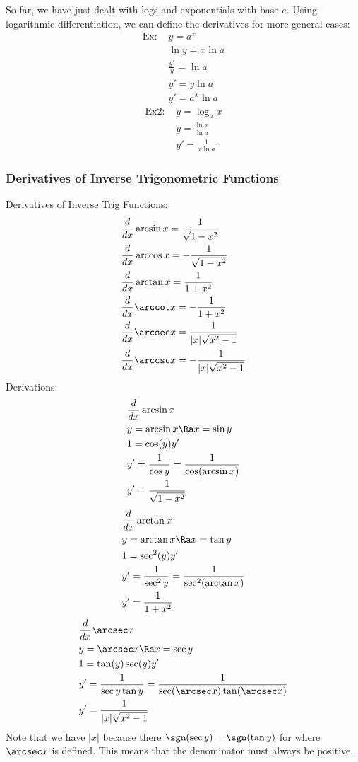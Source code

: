 So far, we have just dealt with logs and exponentials with base $e$. Using logarithmic differentiation, we can define the derivatives for more general cases:
\begin{align*}
    \text{Ex: }&y=a^x\\
    &\ln y=x\ln a\\
    &\frac{y'}{y}=\ln a\\
    &y'=y\ln a\\
    &y'=a^x\ln a
\end{align*}
\begin{align*}
    \text{Ex2: }&y=\log_ax\\
    &y=\frac{\ln x}{\ln a}\\
    &y'=\frac{1}{x\ln a}
\end{align*}

\subsubsection{Derivatives of Inverse Trigonometric Functions}
Derivatives of Inverse Trig Functions:
\begin{align*}
    &\frac{d}{dx}\arcsin x=\frac{1}{\sqrt{1-x^2}}\\
    &\frac{d}{dx}\arccos x=-\frac{1}{\sqrt{1-x^2}}\\
    &\frac{d}{dx}\arctan x=\frac{1}{1+x^2}\\
    &\frac{d}{dx}\arccot x=-\frac{1}{1+x^2}\\
    &\frac{d}{dx}\arcsec x=\frac{1}{|x|\sqrt{x^2-1}}\\
    &\frac{d}{dx}\arccsc x=-\frac{1}{|x|\sqrt{x^2-1}}
\end{align*}
Derivations:
\begin{align*}
    &\frac{d}{dx}\arcsin x\\
    &y=\arcsin x\Ra x=\sin y\\
    &1=\cos (y)y'\\
    &y'=\frac{1}{\cos y}=\frac{1}{\cos(\arcsin x)}\\
    &y'=\frac{1}{\sqrt{1-x^2}}
\end{align*}
\begin{align*}
    &\frac{d}{dx}\arctan x\\
    &y=\arctan x\Ra x=\tan y\\
    &1=\sec^2(y)y'\\
    &y'=\frac{1}{\sec^2y}=\frac{1}{\sec^2(\arctan x)}\\
    &y'=\frac{1}{1+x^2}
\end{align*}
\begin{align*}
    &\frac{d}{dx}\arcsec x\\
    &y=\arcsec x\Ra x=\sec y\\
    &1=\tan(y)\sec(y)y'\\
    &y'=\frac{1}{\sec y\tan y}=\frac{1}{\sec(\arcsec x)\tan(\arcsec x)}\\
    &y'=\frac{1}{|x|\sqrt{x^2-1}}
\end{align*}
Note that we have $|x|$ because there $\sgn(\sec y)=\sgn(\tan y)$ for where $\arcsec x$ is defined. This means that the denominator must always be positive.
